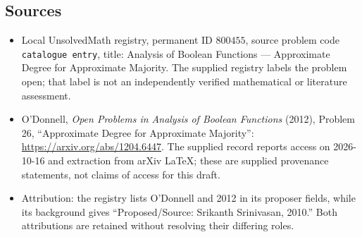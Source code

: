 \documentclass[11pt]{article}
\begin{document}
\subsection{Sources}
\begin{itemize}
\item Local UnsolvedMath registry, permanent ID \(800455\), source problem code \texttt{catalogue entry}, title: Analysis of Boolean Functions --- Approximate Degree for Approximate Majority. The supplied registry labels the problem open; that label is not an independently verified mathematical or literature assessment.
\item O'Donnell, \emph{Open Problems in Analysis of Boolean Functions} (2012), Problem 26, ``Approximate Degree for Approximate Majority'': \url{https://arxiv.org/abs/1204.6447}. The supplied record reports access on 2026-10-16 and extraction from arXiv LaTeX; these are supplied provenance statements, not claims of access for this draft.
\item Attribution: the registry lists O'Donnell and 2012 in its proposer fields, while its background gives ``Proposed/Source: Srikanth Srinivasan, 2010.'' Both attributions are retained without resolving their differing roles.
\end{itemize}
\end{document}
